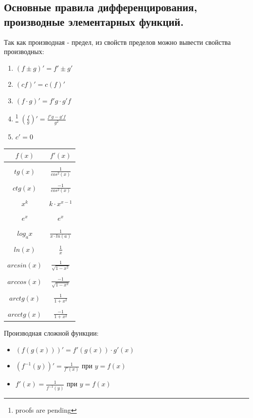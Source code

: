 \documentclass[oneside]{book}
\begin{document}
\begin{enumerate}
\chapter[правила дифференцирования]{Основные правила дифференцирования, производные элементарных функций.}
Так как производная - предел, из свойств пределов можно вывести свойства производных:
\begin{enumerate}
  \item $(f \pm g)' = f' \pm g'$
  \item $(cf)' = c(f)'$
  \item $(f \cdot g)' = f'g \cdot g'f$
  \item\footnote{proofs are pending} $(\frac{f}{g})' = \frac{f'g - g'f}{g^2}$
  \item $c' = 0$
\end{enumerate}
  \begin{center}
      \begin{tabular}{c|c}
        $f(x)$ & $f'(x)$ \\
        \hline \\
        $tg(x)$ & $\frac{1}{cos^2(x)}$ \\
          \hline \\
        $ctg(x)$ & $\frac{-1}{cos^2(x)}$ \\
          \hline \\
        $x^k$ & $k \cdot x^{x-1}$ \\
          \hline \\
        $e^x$ & $e^x$ \\
          \hline \\
        $log_a x$ & $\frac{1}{x \cdot ln(a)}$ \\
          \hline \\
        $ln(x)$ & $\frac{1}{x}$ \\
          \hline \\
        $arcsin(x)$ & $\frac{1}{\sqrt{1 - x^2}}$ \\
          \hline \\
        $arccos(x)$ & $\frac{-1}{\sqrt{1 - x^2}}$ \\
          \hline \\
        $arctg(x)$ & $\frac{1}{1 + x^2}$ \\
          \hline \\
        $arcctg(x)$ & $\frac{-1}{1 + x^2}$ \\
      \end{tabular}
  \end{center}
Производная сложной функции:
\begin{itemize}
  \item $(f(g(x)))' = f'(g(x)) \cdot g'(x)$
  \item $(f^{-1}(y))' = \frac{1}{f'(x)}$ при $y = f(x)$
  \item $f'(x) = \frac{1}{f^{-1}(y)}$ при $y = f(x)$


\end{itemize}
\end{enumerate}
\end{document}
